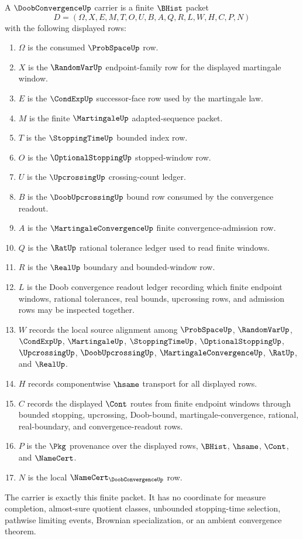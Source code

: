 \begin{definition}
\label{def:doob-convergence-carrier}
A $\DoobConvergenceUp$ carrier is a finite $\BHist$ packet
$$
D=(\Omega,X,E,M,T,O,U,B,A,Q,R,L,W,H,C,P,N)
$$
with the following displayed rows:
\begin{enumerate}
\item $\Omega$ is the consumed $\ProbSpaceUp$ row.
\item $X$ is the $\RandomVarUp$ endpoint-family row for the displayed martingale window.
\item $E$ is the $\CondExpUp$ successor-face row used by the martingale law.
\item $M$ is the finite $\MartingaleUp$ adapted-sequence packet.
\item $T$ is the $\StoppingTimeUp$ bounded index row.
\item $O$ is the $\OptionalStoppingUp$ stopped-window row.
\item $U$ is the $\UpcrossingUp$ crossing-count ledger.
\item $B$ is the $\DoobUpcrossingUp$ bound row consumed by the convergence readout.
\item $A$ is the $\MartingaleConvergenceUp$ finite convergence-admission row.
\item $Q$ is the $\RatUp$ rational tolerance ledger used to read finite windows.
\item $R$ is the $\RealUp$ boundary and bounded-window row.
\item $L$ is the Doob convergence readout ledger recording which finite endpoint windows, rational tolerances, real bounds, upcrossing rows, and admission rows may be inspected together.
\item $W$ records the local source alignment among $\ProbSpaceUp$, $\RandomVarUp$, $\CondExpUp$, $\MartingaleUp$, $\StoppingTimeUp$, $\OptionalStoppingUp$, $\UpcrossingUp$, $\DoobUpcrossingUp$, $\MartingaleConvergenceUp$, $\RatUp$, and $\RealUp$.
\item $H$ records componentwise $\hsame$ transport for all displayed rows.
\item $C$ records the displayed $\Cont$ routes from finite endpoint windows through bounded stopping, upcrossing, Doob-bound, martingale-convergence, rational, real-boundary, and convergence-readout rows.
\item $P$ is the $\Pkg$ provenance over the displayed rows, $\BHist$, $\hsame$, $\Cont$, and $\NameCert$.
\item $N$ is the local $\NameCert_{\DoobConvergenceUp}$ row.
\end{enumerate}
The carrier is exactly this finite packet. It has no coordinate for measure completion, almost-sure quotient classes, unbounded stopping-time selection, pathwise limiting events, Brownian specialization, or an ambient convergence theorem.
\end{definition}

